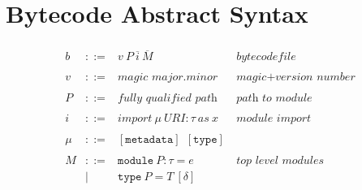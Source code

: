 \documentclass{article}
\newcommand{\keywadj}[1]{\mathtt{#1}}
\newcommand{\keyw}[1]{\keywadj{#1}~}
\begin{document}
\section{Bytecode Abstract Syntax}


\[
\begin{array}{lll}
\begin{array}{lllr}
b   & ::= & v ~P ~\overline{i} ~\overline{M}        & bytecode file \\
&&\\
v   & ::= & \textit{magic major.minor}              & \textit{magic+version number} \\
&&\\

P   & ::= & \textit{fully qualified path}           & \textit{path to module} \\
&&\\

i   & ::= & import ~\mu ~\textit{URI} : \tau ~as ~x & \textit{module import} \\
&&\\

\mu & ::= & \keyw{[metadata]} ~\keyw{[type]}        & \\
&&\\


M & ::= & \keyw{module} P: \tau = e   & \textit{top level modules} \\
  & |   & \keyw{type} P = T ~[\delta] & \\
&&\\


\end{array}
\end{array}\]
\end{document}
